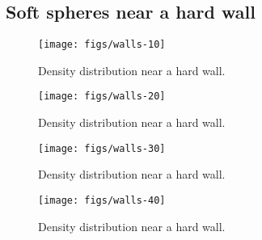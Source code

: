\documentclass[letterpaper,twocolumn,amsmath,amssymb,prb]{revtex4-1}
\begin{document}

\subsection{Soft spheres near a hard wall}

\begin{figure}
\begin{center}
\texttt{[image: figs/walls-10]}
\end{center}
\caption{Density distribution near a hard wall.}
\label{fig:walls-10}
\end{figure}

\begin{figure}
\begin{center}
\texttt{[image: figs/walls-20]}
\end{center}
\caption{Density distribution near a hard wall.}
\label{fig:walls-20}
\end{figure}

\begin{figure}
\begin{center}
\texttt{[image: figs/walls-30]}
\end{center}
\caption{Density distribution near a hard wall.}
\label{fig:walls-30}
\end{figure}

\begin{figure}
\begin{center}
\texttt{[image: figs/walls-40]}
\end{center}
\caption{Density distribution near a hard wall.}
\label{fig:walls-40}
\end{figure}



\end{document}
